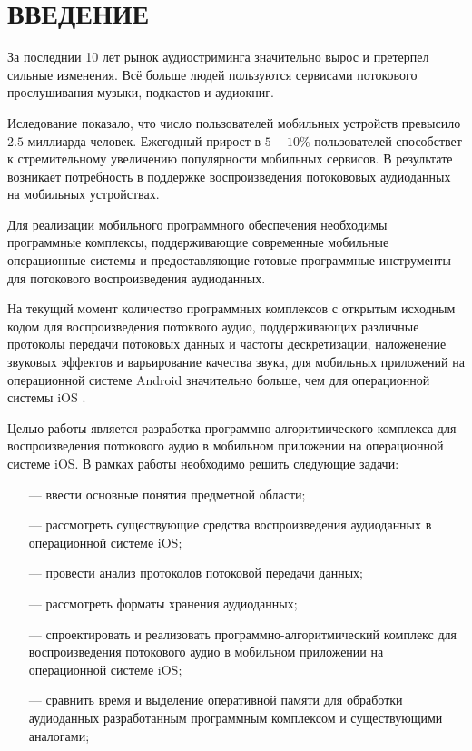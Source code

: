 \section*{ВВЕДЕНИЕ}

\par За последнии 10 лет рынок аудиостриминга значительно вырос и претерпел сильные изменения\cite{robeco}.
Всё больше людей пользуются сервисами потокового прослушивания музыки, подкастов и аудиокниг.

\par Иследование \cite{scirp} показало, что число пользователей мобильных устройств превысило $2.5$ миллиарда человек.
Ежегодный прирост в $5-10\%$ пользователей способствет к стремительному увеличению популярности мобильных сервисов.
В результате возникает потребность в поддержке воспроизведения потокововых аудиоданных на мобильных устройствах.

\par Для реализации мобильного программного обеспечения необходимы программные комплексы, 
поддерживающие современные мобильные операционные системы и предоставляющие готовые программные инструменты для потокового воспроизведения аудиоданных.

\par На текущий момент количество программных комплексов с открытым исходным кодом для воспроизведения потоквого аудио,
поддерживающих различные протоколы передачи потоковых данных и частоты дескретизации, 
наложенение звуковых эффектов и варьирование качества звука,
для мобильных приложений на операционной системе Android значительно больше, чем для операционной системы iOS \cite{iOSOS}.
  
\par Целью работы является разработка программно-алгоритмического комплекса для воспроизведения потокового аудио в мобильном приложении на операционной системе iOS.
В рамках работы необходимо решить следующие задачи:

\begin{itemize}
    \item[---] ввести основные понятия предметной области;
    \item[---] рассмотреть существующие средства воспроизведения аудиоданных в операционной системе iOS;
    \item[---] провести анализ протоколов потоковой передачи данных;
    \item[---] рассмотреть форматы хранения аудиоданных;
    \item[---] спроектировать и реализовать программно-алгоритмический комплекс для воспроизведения потокового аудио в мобильном приложении на операционной системе iOS;
    \item[---] сравнить время и выделение оперативной памяти для обработки аудиоданных разработанным программным комплексом и существующими аналогами;
\end{itemize}
